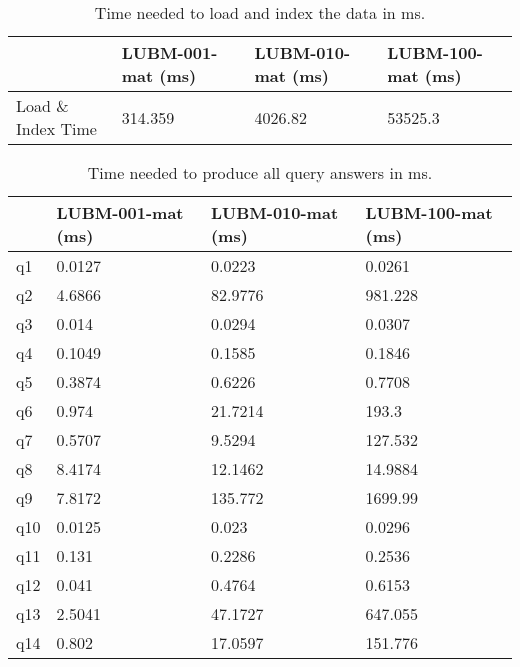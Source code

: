\documentclass{article}
\begin{document}
\begin{enumerate}
\begin{table}[H]\centering
\begin{tabular}{|l|l|l|l|}
\hline
                   & LUBM-001-mat (ms) & LUBM-010-mat (ms) & LUBM-100-mat (ms)\\ \hline
Load \& Index Time & 314.359         & 4026.82        & 53525.3        \\ \hline
\end{tabular}
\caption{Time needed to load and index the data in ms.}
\end{table}



\begin{table}[H]\centering
\begin{tabular}{|l|l|l|l|}
\hline
    & LUBM-001-mat (ms) & LUBM-010-mat (ms) & LUBM-100-mat (ms) \\ \hline
q1  & 0.0127            & 0.0223            & 0.0261            \\ \hline
q2  & 4.6866            & 82.9776           & 981.228           \\ \hline
q3  & 0.014             & 0.0294            & 0.0307            \\ \hline
q4  & 0.1049            & 0.1585            & 0.1846            \\ \hline
q5  & 0.3874            & 0.6226            & 0.7708            \\ \hline
q6  & 0.974             & 21.7214           & 193.3             \\ \hline
q7  & 0.5707            & 9.5294            & 127.532           \\ \hline
q8  & 8.4174            & 12.1462           & 14.9884           \\ \hline
q9  & 7.8172            & 135.772           & 1699.99           \\ \hline
q10 & 0.0125            & 0.023             & 0.0296            \\ \hline
q11 & 0.131             & 0.2286            & 0.2536            \\ \hline
q12 & 0.041             & 0.4764            & 0.6153            \\ \hline
q13 & 2.5041            & 47.1727           & 647.055           \\ \hline
q14 & 0.802             & 17.0597           & 151.776           \\ \hline
\end{tabular}
\caption{Time needed to produce  all query answers in ms.}
\end{table}


\end{enumerate}
\end{document}
